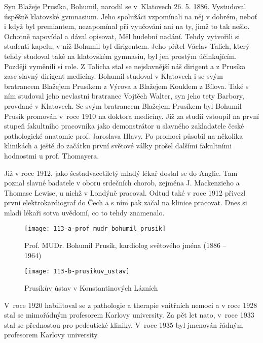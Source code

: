 \documentclass[../dejiny-rodu-prusiku.tex]{subfiles}
\begin{document}
Syn Blažeje Prusíka, Bohumil, narodil se v Klatovech 26. 5. 1886. Vystudoval úspěšně klatovské gvmnasium. Jeho spolužáci vzpomínali na něj v dobrém, neboť i když byl premiantem, nezapomínal při vyučování ani na ty, jimž to tak nešlo. Ochotně napovídal a dával opisovat, Měl hudební nadání. Tehdy vytvořili si studenti kapelu, v níž Bohumil byl dirigentem. Jeho přítel Václav Talich, který tehdy studoval také na klatovském gymnasiu, byl jen prostým účinkujícím. Později vyměnili si role. Z Talicha stal se nejslavnější náš dirigent a z Prusíka zase slavný dirigent medicíny. Bohumil studoval v Klatovech i se svým bratrancem Blažejem Prusíkem z Výrova a Blažejem Kouklem z Bílova. Také s ním studoval jeho nevlastní bratranec Vojtěch Walter, syn jeho tety Barbory, provdané v Klatovech. Se svým bratrancem Blažejem Prusíkem byl Bohumil Prusík promován v roce 1910 na doktora medicíny. Již za studií vstoupil na první stupeň fakultního pracovníka jako demonstrátor u slavného zakladatele české pathologické anatomie prof. Jaroslava Hlavy. Po promoci působil na několika klinikách a ještě do začátku první světové války prošel dalšími fakultními hodnostmi u prof. Thomayera.

Již v roce 1912, jako šestadvacetiletý mladý lékař dostal se do Anglie. Tam poznal slavné badatele v oboru srdečních chorob, zejména J. Mackenzieho a Thomase Lewise, u nichž v Londýně pracoval. Odtud také v roce 1912 přivezl první elektrokardiograf do Čech a s ním pak začal na klinice pracovat. Dnes si mladí lékaři sotva uvědomí, co to tehdy znamenalo.

\begin{figure}
\centering
\texttt{[image: 113-a-prof\_mudr\_bohumil\_prusik]}
\caption{Prof. MUDr. Bohumil Prusík, kardiolog světového jména (1886 – 1964)}
\label{fig:113-a-prof_mudr_bohumil_prusik}
\end{figure}

\begin{figure}
\centering
\texttt{[image: 113-b-prusikuv\_ustav]}
\caption{Prusíkův ústav v Konstantinových Lázních}
\label{fig:113-b-prusikuv_ustav}
\end{figure}

V roce 1920 habilitoval se z pathologie a therapie vnitřních nemoci a v roce 1928 stal se mimořádným profesorem Karlovy university. Za pět let nato, v roce  1933 stal se přednostou pro pedeutické kliniky. V roce 1935 byl jmenován řádným profesorem Karlovy university.
\end{document}

